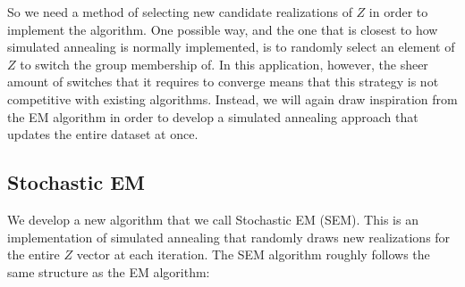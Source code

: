 \documentclass{article}
\theoremstyle{definition}
\theoremstyle{algodesc}
\begin{document}
So we need a method of selecting new candidate realizations of $Z$ in order to implement the algorithm. One possible way, and the one that is closest to how simulated annealing is normally implemented, is to randomly select an element of $Z$ to switch the group membership of. In this application, however, the sheer amount of switches that it requires to converge means that this strategy is not competitive with existing algorithms. Instead, we will again draw inspiration from the EM algorithm in order to develop a simulated annealing approach that updates the entire dataset at once.


\subsection{Stochastic EM}

We develop a new algorithm that we call Stochastic EM (SEM). This is an implementation of simulated annealing that randomly draws new realizations for the entire $Z$ vector at each iteration. The SEM algorithm roughly follows the same structure as the EM algorithm:
\end{document}
